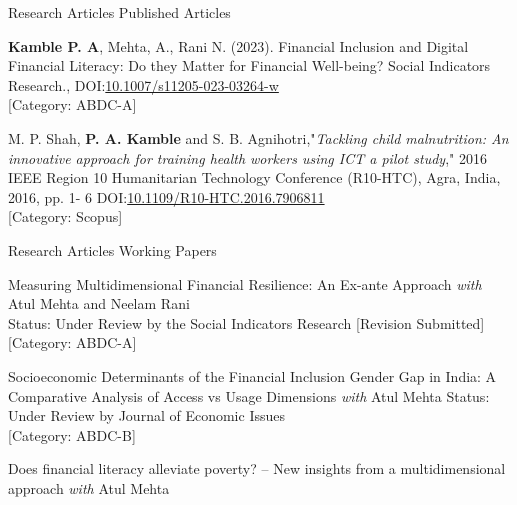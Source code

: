 

\begin{cventries}

\cventry
{Research Articles} %
{Published Articles} %
{} %
{} %
{ %
\begin{cvitems}
\item {\textbf{Kamble P. A}, Mehta, A., Rani N. (2023). Financial Inclusion and Digital Financial Literacy: Do they Matter for Financial Well-being? Social Indicators Research., DOI:\href{https://doi.org/10.1007/s11205-023-03264-w}{\space \color{blue}10.1007/s11205-023-03264-w}}\\ 
{\color{red}[Category: ABDC-A]}
\item {M. P. Shah, \textbf{P. A. Kamble} and S. B. Agnihotri,"\textit{Tackling child malnutrition: An innovative approach for training health workers using ICT a pilot study}," 2016 IEEE Region 10 Humanitarian Technology Conference (R10-HTC), Agra, India, 2016, pp. 1- 6 DOI:\href{https://ieeexplore.ieee.org/abstract/document/7906811}{\space \color{blue}10.1109/R10-HTC.2016.7906811}}\\ 
{\color{red}[Category: Scopus]}
\end{cvitems}
}
\cventry
{Research Articles} %
{Working Papers} %
{} %
{} %
{ %
\begin{cvitems}
\item Measuring Multidimensional Financial Resilience: An Ex-ante Approach \textit{with} Atul Mehta and Neelam Rani\\
Status: Under Review by the Social Indicators Research [Revision Submitted]\\
{\color{red}[Category: ABDC-A]}
\item Socioeconomic Determinants of the Financial Inclusion Gender Gap in India: A Comparative Analysis of Access vs Usage Dimensions \textit{with} Atul Mehta
Status: Under Review by Journal of Economic Issues \\ 
{\color{red}[Category: ABDC-B]}
\item Does financial literacy alleviate poverty? – New insights from a multidimensional approach \textit{with} Atul Mehta
\end{cvitems}
}
\end{cventries}

